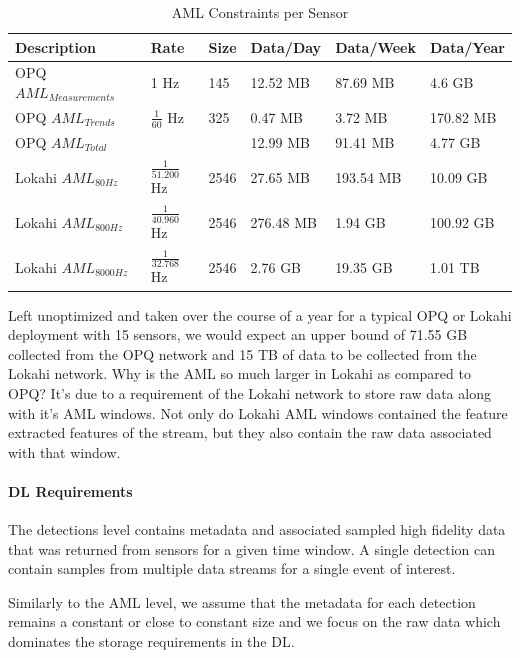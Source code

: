 \begin{table}[H]
	\centering
	\caption{AML Constraints per Sensor}
	\begin{tabularx}{\textwidth}{Xlllll}
		\toprule
		\textbf{Description} & \textbf{Rate} & \textbf{Size} & \textbf{Data/Day} & \textbf{Data/Week} & \textbf{Data/Year} \\
		\midrule
		OPQ $AML_{Measurements}$ 	& 1 Hz 					& 145 			& 12.52 MB 	& 87.69 MB 	& 4.6 GB 	\\
		OPQ $AML_{Trends}$ 			& $\frac{1}{60}$ Hz 	& 325 			& 0.47 MB 	& 3.72 MB  	& 170.82 MB \\
		OPQ $AML_{Total}$ 			&   					&   			& 12.99 MB 	& 91.41 MB 	& 4.77 GB 	\\
		Lokahi $AML_{80Hz}$			& $\frac{1}{51.200}$ Hz	& 2546  		& 27.65 MB 	& 193.54 MB & 10.09 GB	\\
		Lokahi $AML_{800Hz}$		& $\frac{1}{40.960}$ Hz	& 2546		& 276.48 MB & 1.94 GB 	& 100.92 GB \\
		Lokahi $AML_{8000Hz}$		& $\frac{1}{32.768}$ Hz	& 2546		& 2.76 GB 	& 19.35 GB 	& 1.01 TB 	\\
		\bottomrule
	\end{tabularx}
	\label{table:aml_size}
\end{table}

Left unoptimized and taken over the course of a year for a typical OPQ or Lokahi deployment with 15 sensors, we would expect an upper bound of 71.55 GB collected from the OPQ network and 15 TB of data to be collected from the Lokahi network. Why is the AML so much larger in Lokahi as compared to OPQ? It's due to a requirement of the Lokahi network to store raw data along with it's AML windows. Not only do Lokahi AML windows contained the feature extracted features of the stream, but they also contain the raw data associated with that window.

\paragraph{DL Requirements}
The detections level contains metadata and associated sampled high fidelity data that was returned from sensors for a given time window. A single detection can contain samples from multiple data streams for a single event of interest.

Similarly to the AML level, we assume that the metadata for each detection remains a constant or close to constant size and we focus on the raw data which dominates the storage requirements in the DL\@.

